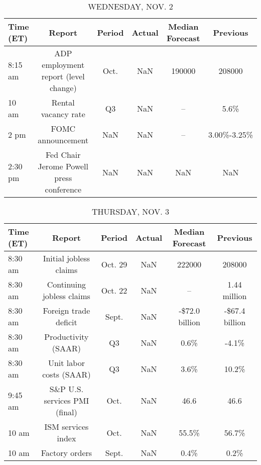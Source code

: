 \documentclass{article}%
\begin{document}
\begin{table}[htbp]%
\caption{WEDNESDAY, NOV. 2}%
\centering%
\begin{adjustbox}{width=1\textwidth}%
\begin{tabular}{lccccc}
\toprule
Time (ET) &                                   Report & Period & Actual & Median Forecast &    Previous \\
\midrule
  8:15 am &     ADP employment report (level change) &   Oct. &    NaN &          190000 &      208000 \\
    10 am &                      Rental vacancy rate &     Q3 &    NaN &              -- &        5.6\% \\
     2 pm &                        FOMC announcement &    NaN &    NaN &              -- & 3.00\%-3.25\% \\
  2:30 pm & Fed Chair Jerome Powell press conference &    NaN &    NaN &             NaN &         NaN \\
\bottomrule
\end{tabular}
%
\end{adjustbox}%
\end{table}

%


\begin{table}[htbp]%
\caption{THURSDAY, NOV. 3}%
\centering%
\begin{adjustbox}{width=1\textwidth}%
\begin{tabular}{lccccc}
\toprule
Time (ET) &                        Report &  Period & Actual & Median Forecast &       Previous \\
\midrule
  8:30 am &        Initial jobless claims & Oct. 29 &    NaN &          222000 &         208000 \\
  8:30 am &     Continuing jobless claims & Oct. 22 &    NaN &              -- &   1.44 million \\
  8:30 am &         Foreign trade deficit &   Sept. &    NaN &  -\$72.0 billion & -\$67.4 billion \\
  8:30 am &           Productivity (SAAR) &      Q3 &    NaN &            0.6\% &          -4.1\% \\
  8:30 am &       Unit labor costs (SAAR) &      Q3 &    NaN &            3.6\% &          10.2\% \\
  9:45 am & S\&P U.S. services PMI (final) &    Oct. &    NaN &            46.6 &           46.6 \\
    10 am &            ISM services index &    Oct. &    NaN &           55.5\% &          56.7\% \\
    10 am &                Factory orders &   Sept. &    NaN &            0.4\% &           0.2\% \\
\bottomrule
\end{tabular}
%
\end{adjustbox}%
\end{table}
\end{document}
